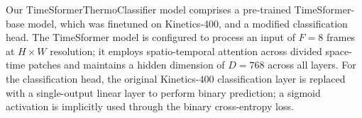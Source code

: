 \documentclass[runningheads]{llncs}
\begin{document}
Our TimeSformerThermoClassifier model comprises a pre-trained
TimeSformer-base model, which was finetuned on Kinetics-400, and a
modified classification head. The TimeSformer model is configured to
process an input of \( F = 8 \) frames at \( H \times W \) resolution;
it employs spatio-temporal attention across divided space-time patches
and maintains a hidden dimension of \( D = 768 \) across all
layers. For the classification head, the original Kinetics-400
classification layer is replaced with a single-output linear layer to
perform binary prediction; a sigmoid activation is implicitly used
through the binary cross-entropy loss.


    
\end{document}
